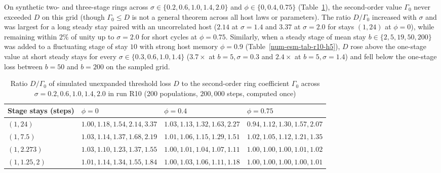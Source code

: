 On synthetic two- and three-stage rings across $\sigma \in \{0.2, 0.6, 1.0, 1.4, 2.0\}$ and $\phi \in \{0, 0.4, 0.75\}$ (Table~\ref{num-esm-tab-r10-h3}), the second-order value $\Gamma_0$ never exceeded $D$ on this grid (though $\Gamma_0 \le D$ is not a general theorem across all host laws or parameters). The ratio $D/\Gamma_0$ increased with $\sigma$ and was largest for a long steady stay paired with an uncorrelated host ($2.14$ at $\sigma = 1.4$ and $3.37$ at $\sigma = 2.0$ for stays $(1, 24)$ at $\phi = 0$), while remaining within $2\%$ of unity up to $\sigma = 2.0$ for short cycles at $\phi = 0.75$. Similarly, when a steady stage of mean stay $b \in \{2, 5, 19, 50, 200\}$ was added to a fluctuating stage of stay $10$ with strong host memory $\phi = 0.9$ (Table~\ref{num-esm-tab-r10-h5}), $D$ rose above the one-stage value at short steady stays for every $\sigma \in \{0.3, 0.6, 1.0, 1.4\}$ ($3.7\times$ at $b = 5, \sigma = 0.3$ and $2.4\times$ at $b = 5, \sigma = 1.4$) and fell below the one-stage loss between $b = 50$ and $b = 200$ on the sampled grid.

\begin{table}[htbp]\centering\small
\caption{Ratio $D/\Gamma_0$ of simulated unexpanded threshold loss $D$ to the second-order ring coefficient $\Gamma_0$ across $\sigma = 0.2, 0.6, 1.0, 1.4, 2.0$ in run R10 (200 populations, $200{,}000$ steps, computed once)}\label{num-esm-tab-r10-h3}
\begin{tabular}{llll}\toprule
Stage stays (steps) & $\phi = 0$ & $\phi = 0.4$ & $\phi = 0.75$\\\midrule
$(1, 24)$ & $1.00, 1.18, 1.54, 2.14, 3.37$ & $1.03, 1.13, 1.32, 1.63, 2.27$ & $0.94, 1.12, 1.30, 1.57, 2.07$\\
$(1, 7.5)$ & $1.03, 1.14, 1.37, 1.68, 2.19$ & $1.01, 1.06, 1.15, 1.29, 1.51$ & $1.02, 1.05, 1.12, 1.21, 1.35$\\
$(1, 2.273)$ & $1.03, 1.10, 1.23, 1.37, 1.55$ & $1.00, 1.01, 1.04, 1.07, 1.11$ & $1.00, 1.00, 1.00, 1.01, 1.02$\\
$(1, 1.25, 2)$ & $1.01, 1.14, 1.34, 1.55, 1.84$ & $1.00, 1.03, 1.06, 1.11, 1.18$ & $1.00, 1.00, 1.00, 1.00, 1.01$\\\bottomrule
\end{tabular}
\end{table}

